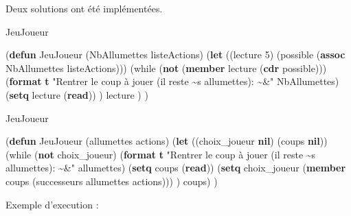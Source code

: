 \documentclass[
]{article}
\newenvironment{Shaded}{}{}
\newcommand{\DecValTok}[1]{\textcolor[rgb]{0.25,0.63,0.44}{#1}}
\newcommand{\FunctionTok}[1]{\textcolor[rgb]{0.02,0.16,0.49}{#1}}
\newcommand{\KeywordTok}[1]{\textcolor[rgb]{0.00,0.44,0.13}{\textbf{#1}}}
\newcommand{\NormalTok}[1]{#1}
\newcommand{\StringTok}[1]{\textcolor[rgb]{0.25,0.44,0.63}{#1}}
\begin{document}
Deux solutions ont été implémentées.
\begin{algorithm}[H]
\begin{Shaded}
\begin{Highlighting}[]
    \caption{JeuJoueur}
\NormalTok{(}\KeywordTok{defun}\FunctionTok{ JeuJoueur }\NormalTok{(NbAllumettes listeActions)}
\NormalTok{    (}\KeywordTok{let}\NormalTok{ ((lecture }\DecValTok{5}\NormalTok{)}
\NormalTok{        (possible (}\KeywordTok{assoc}\NormalTok{ NbAllumettes listeActions)))}
\NormalTok{        (while (}\KeywordTok{not}\NormalTok{ (}\KeywordTok{member}\NormalTok{ lecture (}\KeywordTok{cdr}\NormalTok{ possible)))}
\NormalTok{            (}\KeywordTok{format} \KeywordTok{t} \StringTok{"Rentrer le coup à jouer (il reste \textasciitilde{}s allumettes): \textasciitilde{}\&"}\NormalTok{ NbAllumettes)}
\NormalTok{            (}\KeywordTok{setq}\NormalTok{ lecture (}\KeywordTok{read}\NormalTok{))}
\NormalTok{        )}
\NormalTok{        lecture}
\NormalTok{    )}
\NormalTok{)       }
\end{Highlighting}
\end{Shaded}
\end{algorithm}

\begin{algorithm}[H]
\begin{Shaded}
\begin{Highlighting}[]
  \caption{JeuJoueur}
\NormalTok{(}\KeywordTok{defun}\FunctionTok{ JeuJoueur }\NormalTok{(allumettes actions)}
\NormalTok{  (}\KeywordTok{let}\NormalTok{ ((choix\_joueur }\KeywordTok{nil}\NormalTok{)}
\NormalTok{        (coups }\KeywordTok{nil}\NormalTok{))}
\NormalTok{    (while (}\KeywordTok{not}\NormalTok{ choix\_joueur)}
\NormalTok{      (}\KeywordTok{format} \KeywordTok{t} \StringTok{"Rentrer le coup à jouer (il reste \textasciitilde{}s allumettes): \textasciitilde{}\&"}\NormalTok{ allumettes)}
\NormalTok{      (}\KeywordTok{setq}\NormalTok{ coups (}\KeywordTok{read}\NormalTok{))}
\NormalTok{      (}\KeywordTok{setq}\NormalTok{ choix\_joueur (}\KeywordTok{member}\NormalTok{ coups (successeurs allumettes actions)))}
\NormalTok{      )}
\NormalTok{    coups)}
\NormalTok{  )}
\end{Highlighting}
\end{Shaded}
\end{algorithm}
Exemple d'execution :
\end{document}
